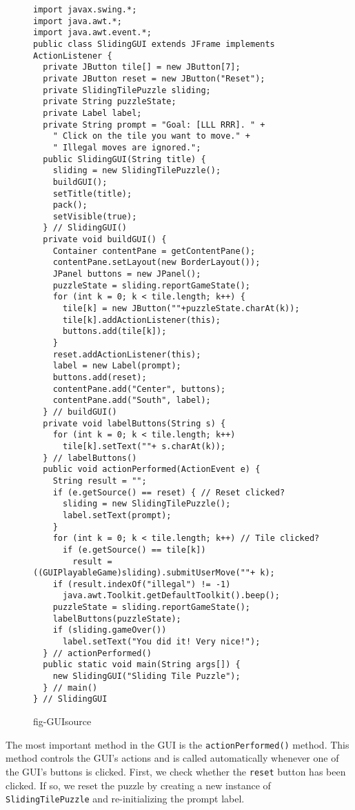 \begin{figure}[p]
\scriptsize
\jjjprogstart
\begin{jjjlisting}
\begin{lstlisting}[basicstyle=\scriptsize]
import javax.swing.*;
import java.awt.*;
import java.awt.event.*;
public class SlidingGUI extends JFrame implements ActionListener {
  private JButton tile[] = new JButton[7];
  private JButton reset = new JButton("Reset");
  private SlidingTilePuzzle sliding;
  private String puzzleState;
  private Label label;
  private String prompt = "Goal: [LLL RRR]. " +
    " Click on the tile you want to move." +
    " Illegal moves are ignored.";
  public SlidingGUI(String title) {
    sliding = new SlidingTilePuzzle();
    buildGUI();
    setTitle(title);
    pack();
    setVisible(true);
  } // SlidingGUI()
  private void buildGUI() {
    Container contentPane = getContentPane();
    contentPane.setLayout(new BorderLayout());
    JPanel buttons = new JPanel();
    puzzleState = sliding.reportGameState();
    for (int k = 0; k < tile.length; k++) {
      tile[k] = new JButton(""+puzzleState.charAt(k));
      tile[k].addActionListener(this);
      buttons.add(tile[k]);
    }
    reset.addActionListener(this);
    label = new Label(prompt);
    buttons.add(reset);
    contentPane.add("Center", buttons);
    contentPane.add("South", label);
  } // buildGUI()
  private void labelButtons(String s) {
    for (int k = 0; k < tile.length; k++)
      tile[k].setText(""+ s.charAt(k));
  } // labelButtons()
  public void actionPerformed(ActionEvent e) {
    String result = "";
    if (e.getSource() == reset) { // Reset clicked?
      sliding = new SlidingTilePuzzle();
      label.setText(prompt);
    }
    for (int k = 0; k < tile.length; k++) // Tile clicked?
      if (e.getSource() == tile[k])
        result = ((GUIPlayableGame)sliding).submitUserMove(""+ k);
    if (result.indexOf("illegal") != -1)
      java.awt.Toolkit.getDefaultToolkit().beep();
    puzzleState = sliding.reportGameState();
    labelButtons(puzzleState);
    if (sliding.gameOver()) 
      label.setText("You did it! Very nice!");
  } // actionPerformed()
  public static void main(String args[]) {
    new SlidingGUI("Sliding Tile Puzzle");
  } // main()
} // SlidingGUI
\end{lstlisting}
\end{jjjlisting}
{fig-GUIsource}
\end{figure}

The most important method in the GUI is the {\tt actionPerformed()}
method. This method controls the GUI's actions and is called
automatically whenever one of the GUI's buttons is clicked. First, we
check whether the {\tt reset} button has been clicked. If so, we reset
the puzzle by creating a new instance of {\tt SlidingTilePuzzle} and
re-initializing the prompt label.


